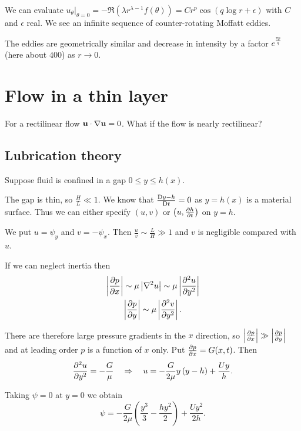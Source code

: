 \documentclass{notes}
\theoremstyle{plain}
\begin{document}
We can evaluate $\left.u_{\theta}\right|_{\theta = 0}
= - \Re \left( \lambda r^{\lambda - 1} f(\theta)\right) =
C r^p \cos\left( q \log r + \epsilon \right)$ with $C$ and $\epsilon$
real.  We see an infinite sequence of counter-rotating Moffatt eddies.

\vspace{1in}

The eddies are geometrically similar and decrease in intensity by a factor
$e^{\frac{\pi p}{q}}$ (here about $400$) as $r \to 0$. 

\chapter{Flow in a thin layer}

For a rectilinear flow $\mathbf{u} \cdot \nabla \mathbf{u} = 0$. What if the flow
is nearly rectilinear?

\section{Lubrication theory}

Suppose fluid is confined in a gap $0 \le y \le h(x)$.

\vspace{1in}

The gap is thin, so $\frac{H}{L} \ll 1$.  We know that
$\frac{\mathrm{D} y-h}{\mathrm{D} t} = 0$ as $y = h(x)$ is a material surface.  Thus we can
either specify $(u,v)$ or $\left(u,\frac{\partial h}{\partial t}\right)$ on $y=h$.

We put $u = \psi_y$ and $v = - \psi_x$.  Then $\frac{u}{v} \sim \frac{L}{H}
\gg 1$ and $v$ is negligible compared with $u$.

If we can neglect inertia then
\begin{gather*}
\left|\frac{\partial p}{\partial x}\right| \sim \mu \left|\nabla^2 u\right| \sim \mu \left|\frac{\partial ^2 u}{\partial y^2}\right| \\
\left|\frac{\partial p}{\partial y}\right| \sim \mu \left|\frac{\partial ^2 v}{\partial y^2}\right|.
\end{gather*}

There are therefore large pressure gradients in the $x$ direction, so
$\left|\frac{\partial p}{\partial x}\right| \gg \left|\frac{\partial p}{\partial y}\right|$ and at leading order
$p$ is a function of $x$ only.  Put $\frac{\partial p}{\partial x} = G(x,t)$.  Then
\[
\frac{\partial ^2 u}{\partial y^2} = -\frac{G}{\mu} \quad \Rightarrow \quad
u = - \frac{G}{2 \mu} y \left(y - h\right) + \frac{U y}{h}.
\]

Taking $\psi = 0$ at $y=0$ we obtain
\[
\psi = -\frac{G}{2 \mu} \left( \frac{y^3}{3} - \frac{h y^2}{2} \right)
+ \frac{U y^2}{2 h}.
\]
\end{document}
